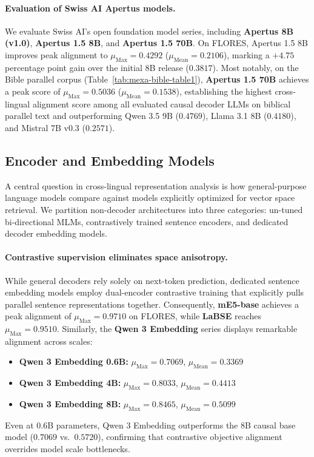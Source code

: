 \paragraph{Evaluation of Swiss AI Apertus models.}
We evaluate Swiss AI's open foundation model series, including \textbf{Apertus 8B (v1.0)}, \textbf{Apertus 1.5 8B}, and \textbf{Apertus 1.5 70B}. On FLORES, Apertus 1.5 8B improves peak alignment to $\mu_{\text{Max}} = 0.4292$ ($\mu_{\text{Mean}} = 0.2106$), marking a $+4.75$ percentage point gain over the initial 8B release ($0.3817$). Most notably, on the Bible parallel corpus (Table~\ref{tab:mexa-bible-table1}), \textbf{Apertus 1.5 70B} achieves a peak score of $\mu_{\text{Max}} = 0.5036$ ($\mu_{\text{Mean}} = 0.1538$), establishing the highest cross-lingual alignment score among all evaluated causal decoder LLMs on biblical parallel text and outperforming Qwen 3.5 9B ($0.4769$), Llama 3.1 8B ($0.4180$), and Mistral 7B v0.3 ($0.2571$).

\subsection{Encoder and Embedding Models}
\label{subsec:results-encoder-embedding}

A central question in cross-lingual representation analysis is how general-purpose language models compare against models explicitly optimized for vector space retrieval. We partition non-decoder architectures into three categories: un-tuned bi-directional MLMs, contrastively trained sentence encoders, and dedicated decoder embedding models.

\paragraph{Contrastive supervision eliminates space anisotropy.}
While general decoders rely solely on next-token prediction, dedicated sentence embedding models employ dual-encoder contrastive training that explicitly pulls parallel sentence representations together. Consequently, \textbf{mE5-base} achieves a peak alignment of $\mu_{\text{Max}} = 0.9710$ on FLORES, while \textbf{LaBSE} reaches $\mu_{\text{Max}} = 0.9510$. Similarly, the \textbf{Qwen 3 Embedding} series displays remarkable alignment across scales:
\begin{itemize}
    \item \textbf{Qwen 3 Embedding 0.6B:} $\mu_{\text{Max}} = 0.7069$, $\mu_{\text{Mean}} = 0.3369$
    \item \textbf{Qwen 3 Embedding 4B:} $\mu_{\text{Max}} = 0.8033$, $\mu_{\text{Mean}} = 0.4413$
    \item \textbf{Qwen 3 Embedding 8B:} $\mu_{\text{Max}} = 0.8465$, $\mu_{\text{Mean}} = 0.5099$
\end{itemize}
Even at 0.6B parameters, Qwen 3 Embedding outperforms the 8B causal base model ($0.7069$ vs.\ $0.5720$), confirming that contrastive objective alignment overrides model scale bottlenecks.

